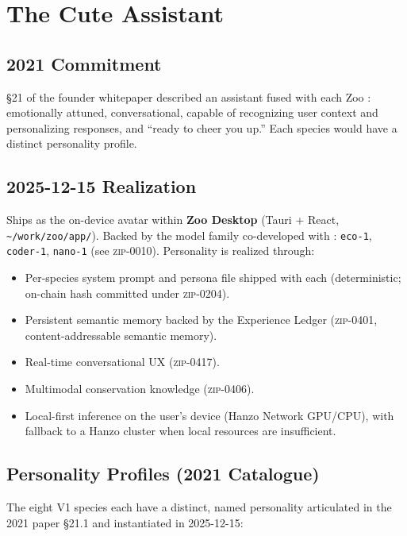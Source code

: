 \section{The Cute \AI{} Assistant}
\label{sec:cute-ai}

\subsection{2021 Commitment}

\S21 of the founder whitepaper described an \AI{} assistant fused
with each Zoo \NFT{}: emotionally attuned, conversational, capable of
recognizing user context and personalizing responses, and ``ready to
cheer you up.'' Each species would have a distinct personality
profile.

\subsection{2025-12-15 Realization}

Ships as the on-device avatar within \textbf{Zoo Desktop}
(Tauri + React, \texttt{\textasciitilde/work/zoo/app/}). Backed by the
\Zen{} model family co-developed with \Hanzo{} \AI{}: \texttt{eco-1},
\texttt{coder-1}, \texttt{nano-1} (see \textsc{zip-0010}). Personality
is realized through:

\begin{itemize}[nosep,leftmargin=1.2em]
\item Per-species system prompt and persona file shipped with each
  \NFT{} (deterministic; on-chain hash committed under
  \textsc{zip-0204}).
\item Persistent semantic memory backed by the Experience Ledger
  (\textsc{zip-0401}, content-addressable semantic memory).
\item Real-time conversational UX (\textsc{zip-0417}).
\item Multimodal conservation knowledge (\textsc{zip-0406}).
\item Local-first inference on the user's device (Hanzo Network
  GPU/CPU), with fallback to a Hanzo cluster when local resources are
  insufficient.
\end{itemize}

\subsection{Personality Profiles (2021 Catalogue)}

The eight V1 species each have a distinct, named personality
articulated in the 2021 paper \S21.1 and instantiated in
2025-12-15:

